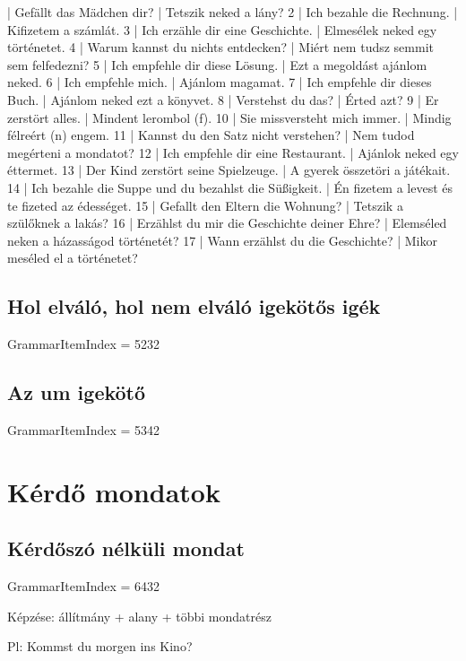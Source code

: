 \documentclass{article}
\newenvironment{desc}{\verbatim}{\endverbatim}
\newenvironment{exmp}{\verbatim}{\endverbatim}
\begin{document}
\begin{exmp}
1 | Gefällt das Mädchen dir? | Tetszik neked a lány?
2 | Ich bezahle die Rechnung. | Kifizetem a számlát.
3 | Ich erzähle dir eine Geschichte. | Elmesélek neked egy történetet.
4 | Warum kannst du nichts entdecken? | Miért nem tudsz semmit sem felfedezni?
5 | Ich empfehle dir diese Lösung. | Ezt a megoldást ajánlom neked.
6 | Ich empfehle mich. | Ajánlom magamat.
7 | Ich empfehle dir dieses Buch. | Ajánlom neked ezt a könyvet.
8 | Verstehst du das? | Érted azt?
9 | Er zerstört alles. | Mindent lerombol (f).
10 | Sie missversteht mich immer. | Mindig félreért (n) engem.
11 | Kannst du den Satz nicht verstehen? | Nem tudod megérteni a mondatot?
12 | Ich empfehle dir eine Restaurant. | Ajánlok neked egy éttermet.
13 | Der Kind zerstört seine Spielzeuge. | A gyerek összetöri a játékait.
14 | Ich bezahle die Suppe und du bezahlst die Süßigkeit. | Én fizetem a levest és te fizeted az édességet.
15 | Gefallt den Eltern die Wohnung? | Tetszik a szülőknek a lakás?
16 | Erzählst du mir die Geschichte deiner Ehre? | Elemséled neken a házasságod történetét?
17 | Wann erzählst du die Geschichte? | Mikor meséled el a történetet?
\end{exmp}

\subsection{Hol elváló, hol nem elváló igekötős igék}

GrammarItemIndex = 5232

\subsection{Az um igekötő}

GrammarItemIndex = 5342

\section{Kérdő mondatok}

\subsection{Kérdőszó nélküli mondat}

GrammarItemIndex = 6432

\begin{desc}
Képzése: állítmány + alany + többi mondatrész

Pl: Kommst du morgen ins Kino?
\end{desc}
\end{document}
